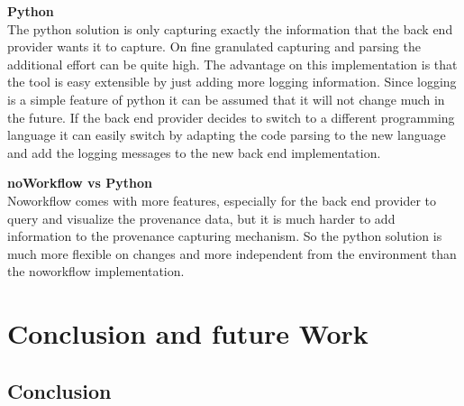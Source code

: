 \documentclass[draft,final]{vutinfth} %
\begin{document}
\textbf{Python} \\
The python solution is only capturing exactly the information that the back end provider wants it to capture. On fine granulated capturing and parsing the additional effort can be quite high. The advantage on this implementation is that the tool is easy extensible by just adding more logging information. Since logging is a simple feature of python it can be assumed that it will not change much in the future. If the back end provider decides to switch to a different programming language it can easily switch by adapting the code parsing to the new language and add the logging messages to the new back end implementation. 

\textbf{noWorkflow vs Python} \\
Noworkflow comes with more features, especially for the back end provider to query and visualize the provenance data, but it is much harder to add information to the provenance capturing mechanism. So the python solution is much more flexible on changes and more independent from the environment than the noworkflow implementation. 

\chapter{Conclusion and future Work}\label{Conclusion}


\section{Conclusion}
\end{document}
